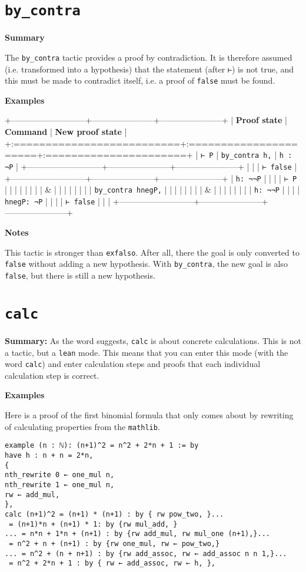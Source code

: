 \documentclass{memoir}
\begin{document}
\section{\Verb|by_contra|}

\textbf{Summary}

The \Verb|by_contra| tactic provides a proof by contradiction. It is therefore assumed (i.e. transformed into a hypothesis) that the statement (after \Verb|⊢|) is not true, and this must be made to contradict itself, i.e. a proof of \Verb|false| must be found.

\textbf{Examples}

+---------------------------+-----------------------+-----------------------+
| \textbf{Proof state} | \textbf{Command} | \textbf{New proof state} |
+:==========================+:======================+:======================+
| \Verb|⊢ P| | \Verb|by_contra h,| | \Verb|h : ¬P| |
+---------------------------+-----------------------+-----------------------+
| | | \Verb|⊢ false| |
+---------------------------+-----------------------+-----------------------+
| \Verb|h: ¬¬P| | | |
| \Verb|⊢ P| | | |
| | | |
| & | | |
| | | |
| \Verb|by_contra hnegP,| | | |
| | | |
| & | | |
| | | |
| \Verb|h: ¬¬P| | | |
| \Verb|hnegP: ¬P| | | |
| \Verb|⊢ false| | | |
+---------------------------+-----------------------+-----------------------+

\textbf{Notes}

This tactic is stronger than \Verb|exfalso|. After all, there the goal is only converted to \Verb|false| without adding a new hypothesis. With \Verb|by_contra|, the new goal is also \Verb|false|, but there is still a new hypothesis.




\section{\Verb|calc|}

\textbf{Summary:} As the word suggests, \Verb|calc| is about concrete calculations. This is not a tactic, but a \Verb|lean| mode. This means that you can enter this mode (with the word \Verb|calc|) and enter calculation steps and proofs that each individual calculation step is correct.

\textbf{Examples}

Here is a proof of the first binomial formula that only comes about by rewriting of calculating properties from the \Verb|mathlib|.

\begin{verbatim}
example (n : ℕ): (n+1)^2 = n^2 + 2*n + 1 := by
have h : n + n = 2*n,
{
nth_rewrite 0 ← one_mul n,
nth_rewrite 1 ← one_mul n,
rw ← add_mul,
},
calc (n+1)^2 = (n+1) * (n+1) : by { rw pow_two, }...
 = (n+1)*n + (n+1) * 1: by {rw mul_add, }
... = n*n + 1*n + (n+1) : by {rw add_mul, rw mul_one (n+1),}...
 = n^2 + n + (n+1) : by {rw one_mul, rw ← pow_two,}
... = n^2 + (n + n+1) : by {rw add_assoc, rw ← add_assoc n n 1,}...
 = n^2 + 2*n + 1 : by { rw ← add_assoc, rw ← h, },

\end{verbatim}
\end{document}
